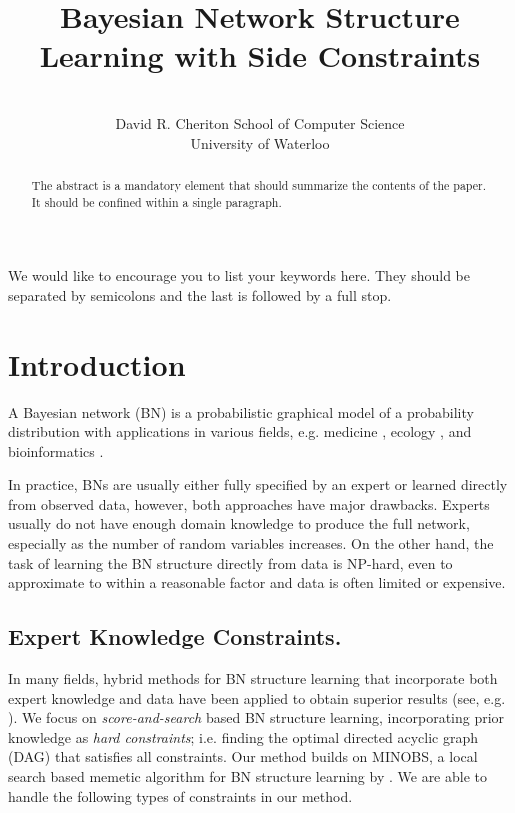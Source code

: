 \documentclass[twoside,11pt]{article}
\title{ Bayesian Network Structure Learning with Side Constraints }
\author{\Name{Andrew C. Li} \Email{acli@uwaterloo.ca}\and
   \Name{Peter van Beek} \Email{vanbeek@cs.uwaterloo.ca}\\
   \addr 	David R. Cheriton School of Computer Science  \\
	University of Waterloo \\ }
\begin{document}
\maketitle

\begin{abstract}%
The abstract is a mandatory element that should summarize the contents of the paper. It should be confined within a single paragraph.
\end{abstract}
\begin{keywords}
We would like to encourage you to list your keywords here. They should be separated by semicolons and the last is followed by a full stop.
\end{keywords}

%
%
%
%
%
\section{Introduction}

A Bayesian network (BN) is a probabilistic graphical model of a probability distribution
with applications in various fields, e.g. medicine \citep{Flores2011}, ecology \citep{Pollino2007},
and bioinformatics \citep{Friedman2000}. 

\medskip
In practice, BNs are usually either fully specified by an expert or learned directly from observed data, however,
both approaches have major drawbacks. Experts usually do not have enough domain knowledge to produce the
full network, especially as the number of random variables increases. On the other hand, the task of learning the 
BN structure directly from data is NP-hard, even to approximate to within a reasonable factor 
\citep{ChickeringMH03,Dasgupta1999} and data is often limited or expensive.

\subsection{Expert Knowledge Constraints.}
In many fields, hybrid methods for BN structure learning that incorporate both expert knowledge and data
have been applied to obtain superior results (see, e.g. \cite{Flores2011, Sesen2013, Oyen2016, Antal2004}).
We focus on \emph{score-and-search} based BN structure learning, incorporating prior knowledge as \emph{hard
constraints}; i.e. finding the optimal directed acyclic graph (DAG) that satisfies all constraints. Our method builds on MINOBS, a local search based
memetic algorithm for BN structure learning by \cite{Lee2017}. We are able to handle the following types of constraints in our
method.
\end{document}
